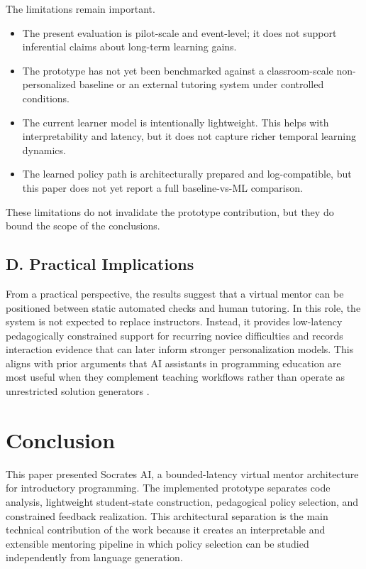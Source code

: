 ﻿\documentclass[conference]{IEEEtran}
\newcommand{\system}{Socrates AI}
\begin{document}
The limitations remain important.
\begin{itemize}
\item The present evaluation is pilot-scale and event-level; it does not support inferential claims about long-term learning gains.
\item The prototype has not yet been benchmarked against a classroom-scale non-personalized baseline or an external tutoring system under controlled conditions.
\item The current learner model is intentionally lightweight. This helps with interpretability and latency, but it does not capture richer temporal learning dynamics.
\item The learned policy path is architecturally prepared and log-compatible, but this paper does not yet report a full baseline-vs-ML comparison.
\end{itemize}

These limitations do not invalidate the prototype contribution, but they do bound the scope of the conclusions.

\subsection*{D. Practical Implications}

From a practical perspective, the results suggest that a virtual mentor can be positioned between static automated checks and human tutoring. In this role, the system is not expected to replace instructors. Instead, it provides low-latency pedagogically constrained support for recurring novice difficulties and records interaction evidence that can later inform stronger personalization models. This aligns with prior arguments that AI assistants in programming education are most useful when they complement teaching workflows rather than operate as unrestricted solution generators \cite{CodeAid,ImprovingAIinCS50,AITutoringinSDEducation}.

\section{Conclusion}

This paper presented \system, a bounded-latency virtual mentor architecture for introductory programming. The implemented prototype separates code analysis, lightweight student-state construction, pedagogical policy selection, and constrained feedback realization. This architectural separation is the main technical contribution of the work because it creates an interpretable and extensible mentoring pipeline in which policy selection can be studied independently from language generation.
\end{document}
